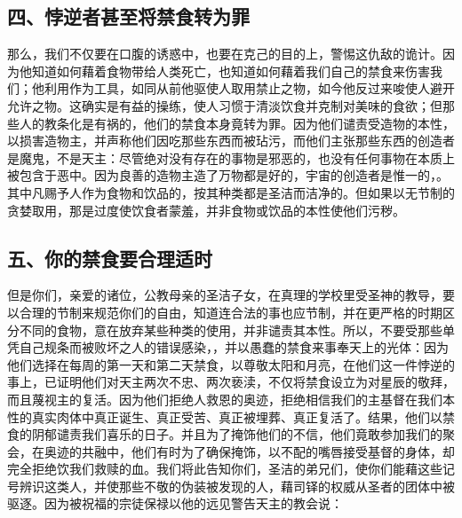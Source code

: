 
\subsection{四、悖逆者甚至将禁食转为罪}

那么，我们不仅要在口腹的诱惑中，也要在克己的目的上，警惕这仇敌的诡计。因为他知道如何藉着食物带给人类死亡，也知道如何藉着我们自己的禁食来伤害我们；他利用作为工具，如同从前他驱使人取用禁止之物，如今他反过来唆使人避开允许之物。这确实是有益的操练，使人习惯于清淡饮食并克制对美味的食欲；但那些人的教条化是有祸的，他们的禁食本身竟转为罪。因为他们谴责受造物的本性，以损害造物主，并声称他们因吃那些东西而被玷污，而他们主张那些东西的创造者是魔鬼，不是天主：尽管绝对没有存在的事物是邪恶的，也没有任何事物在本质上被包含于恶中。因为良善的造物主造了万物都是好的，宇宙的创造者是惟一的，。其中凡赐予人作为食物和饮品的，按其种类都是圣洁而洁净的。但如果以无节制的贪婪取用，那是过度使饮食者蒙羞，并非食物或饮品的本性使他们污秽。\par


\subsection{五、你的禁食要合理适时}

但是你们，亲爱的诸位，公教母亲的圣洁子女，在真理的学校里受圣神的教导，要以合理的节制来规范你们的自由，知道连合法的事也应节制，并在更严格的时期区分不同的食物，意在放弃某些种类的使用，并非谴责其本性。所以，不要受那些单凭自己规条而被败坏之人的错误感染，，并以愚蠢的禁食来事奉天上的光体：因为他们选择在每周的第一天和第二天禁食，以尊敬太阳和月亮，在他们这一件悖逆的事上，已证明他们对天主两次不忠、两次亵渎，不仅将禁食设立为对星辰的敬拜，而且蔑视主的复活。因为他们拒绝人救恩的奥迹，拒绝相信我们的主基督在我们本性的真实肉体中真正诞生、真正受苦、真正被埋葬、真正复活了。结果，他们以禁食的阴郁谴责我们喜乐的日子。并且为了掩饰他们的不信，他们竟敢参加我们的聚会，在奥迹的共融中，他们有时为了确保掩饰，以不配的嘴唇接受基督的身体，却完全拒绝饮我们救赎的血。我们将此告知你们，圣洁的弟兄们，使你们能藉这些记号辨识这类人，并使那些不敬的伪装被发现的人，藉司铎的权威从圣者的团体中被驱逐。因为被祝福的宗徒保禄以他的远见警告天主的教会说：\par

